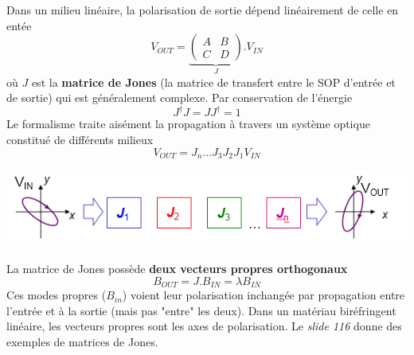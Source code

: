 	Dans un milieu linéaire, la polarisation de sortie dépend linéairement de celle en entée
	\begin{equation}
	{V_{OUT}} = \underbrace{\left( {\begin{array}{*{20}{c}}
A&B\\
C&D
\end{array}} \right)}_{J}.{V_{IN}}
	\end{equation}
	où $J$ est la \textbf{matrice de Jones} (la matrice de transfert entre le SOP d'entrée et de sortie)
	qui est généralement complexe. Par conservation de l'énergie
	\begin{equation}
	{J^\dag }J = J{J^\dag } = 1
	\end{equation}
	Le formalisme traite aisément la propagation à travers un système optique constitué de différents
	milieux
	\begin{equation}
	{V_{OUT}} = {J_n}...{J_3}{J_2}{J_1}{V_{IN}}
	\end{equation}
	\begin{center}
		\includegraphics[scale=0.74]{ch1/image42.png}
	\end{center}
	La matrice de Jones possède \textbf{deux vecteurs propres orthogonaux}
	\begin{equation}
	{B_{OUT}} = J.{B_{IN}} = \lambda {B_{IN}}
	\end{equation}
	Ces modes propres ($B_{in}$) voient leur polarisation inchangée par propagation entre 
	l'entrée et à la sortie (mais pas "entre" les deux). Dans un matériau biréfringent linéaire, 
	les vecteurs propres sont les axes de polarisation. Le \textit{slide 116} donne des exemples
	de matrices de Jones.
	
	

	
	
	
	
	
	
	
	
	
	
	
	
	
	
	
	
	
	
	
	
	